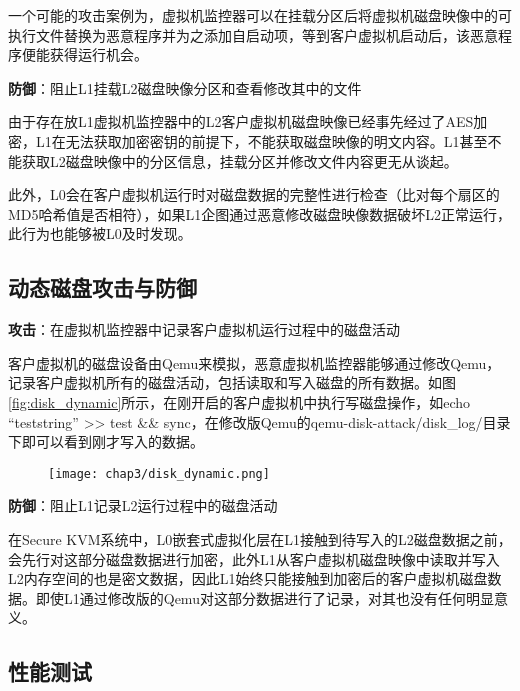 一个可能的攻击案例为，虚拟机监控器可以在挂载分区后将虚拟机磁盘映像中的可执行文件替换为恶意程序并为之添加自启动项，等到客户虚拟机启动后，该恶意程序便能获得运行机会。

\noindent
\textbf{防御\uppercase\expandafter{}}：阻止L1挂载L2磁盘映像分区和查看修改其中的文件

由于存在放L1虚拟机监控器中的L2客户虚拟机磁盘映像已经事先经过了AES加密，L1在无法获取加密密钥的前提下，不能获取磁盘映像的明文内容。L1甚至不能获取L2磁盘映像中的分区信息，挂载分区并修改文件内容更无从谈起。

此外，L0会在客户虚拟机运行时对磁盘数据的完整性进行检查（比对每个扇区的MD5哈希值是否相符），如果L1企图通过恶意修改磁盘映像数据破坏L2正常运行，此行为也能够被L0及时发现。

\subsection{动态磁盘攻击与防御}

\noindent
\textbf{攻击\uppercase\expandafter{}}：在虚拟机监控器中记录客户虚拟机运行过程中的磁盘活动

客户虚拟机的磁盘设备由Qemu来模拟，恶意虚拟机监控器能够通过修改Qemu，记录客户虚拟机所有的磁盘活动，包括读取和写入磁盘的所有数据。如图\ref{fig:disk_dynamic}所示，在刚开启的客户虚拟机中执行写磁盘操作，如echo ``teststring'' >> test \&\& sync，在修改版Qemu的qemu-disk-attack/disk\_log/目录下即可以看到刚才写入的数据。

\begin{figure}[!htbp]
  \centering
  \texttt{[image: chap3/disk\_dynamic.png]}
\end{figure}

\noindent
\textbf{防御\uppercase\expandafter{}}：阻止L1记录L2运行过程中的磁盘活动

在Secure KVM系统中，L0嵌套式虚拟化层在L1接触到待写入的L2磁盘数据之前，会先行对这部分磁盘数据进行加密，此外L1从客户虚拟机磁盘映像中读取并写入L2内存空间的也是密文数据，因此L1始终只能接触到加密后的客户虚拟机磁盘数据。即使L1通过修改版的Qemu对这部分数据进行了记录，对其也没有任何明显意义。

\subsection{性能测试}

